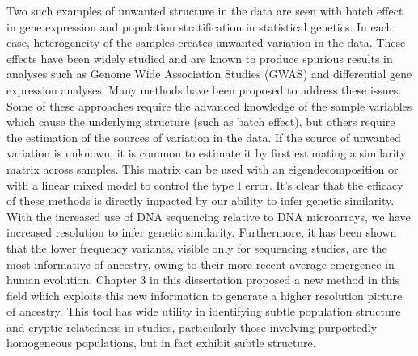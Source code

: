 Two such examples of unwanted structure in the data are seen with batch effect in gene expression and population stratification in statistical genetics. In each case, heterogeneity of the samples creates unwanted variation in the data. These effects have been widely studied and are known to produce spurious results in analyses such as Genome Wide Association Studies (GWAS) and differential gene expression analyses. Many methods have been proposed to address these issues. Some of these approaches require the advanced knowledge of the sample variables which cause the underlying structure (such as batch effect), but others require the estimation of the sources of variation in the data. If the source of unwanted variation is unknown, it is common to estimate it by first estimating a similarity matrix across samples.  This matrix can be used with an eigendecomposition or with a linear mixed model to control the type I error. It's clear that the efficacy of these methods is directly impacted by our ability to infer genetic similarity.  With the increased use of DNA sequencing relative to DNA microarrays, we have increased resolution to infer genetic similarity.  Furthermore, it has been shown that the lower frequency variants, visible only for sequencing studies, are the most informative of ancestry, owing to their more recent average emergence in human evolution. Chapter 3 in this dissertation proposed a new method in this field which exploits this new information to generate a higher resolution picture of ancestry. This tool has wide utility in identifying subtle population structure and cryptic relatedness in studies, particularly those involving purportedly homogeneous populations, but in fact exhibit subtle structure.  

